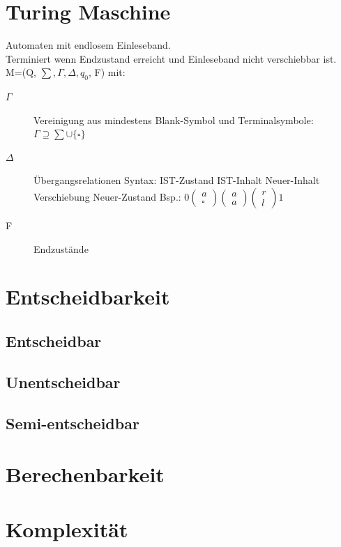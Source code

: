 \documentclass[12pt,a4paper]{article}
\begin{document}
\section{Turing Maschine}
	Automaten mit endlosem Einleseband.\\
	Terminiert wenn Endzustand erreicht und Einleseband nicht verschiebbar ist.\\
	M=(Q, $\sum, \Gamma , \Delta , q_0$, F) mit:\\
	\begin{description}
		\item[$\Gamma$] Vereinigung aus mindestens Blank-Symbol und Terminalsymbole: $\Gamma \supseteq \sum \cup \{ \square \} $
		\item[$\Delta$] Übergangsrelationen Syntax: IST-Zustand IST-Inhalt Neuer-Inhalt Verschiebung Neuer-Zustand Bsp.: $0 \left( \begin{array}{c} a \\ \square \end{array}\right) \left( \begin{array}{c} a \\ a \end{array}\right) \left( \begin{array}{c} r \\ l \end{array} \right) 1$
		\item[F] Endzustände
	\end{description}

\section{Entscheidbarkeit}
	\subsection{Entscheidbar}

	\subsection{Unentscheidbar}

	\subsection{Semi-entscheidbar}

\section{Berechenbarkeit}

\section{Komplexität}
\end{document}
